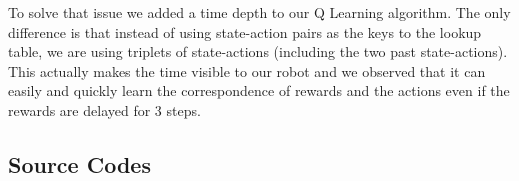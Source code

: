 \documentclass[a4paper,12pt]{article}
\begin{document}
To solve that issue we added a time depth to our Q Learning algorithm. The only difference is that instead of using state-action pairs as the keys to the lookup table, we are using triplets of state-actions (including the two past state-actions). This actually makes the time visible to our robot and we observed that it can easily and quickly learn the correspondence of rewards and the actions even if the rewards are delayed for 3 steps. 

\pagebreak
\begin{appendices}
\section{Source Codes}
    
\end{appendices}
\end{document}
